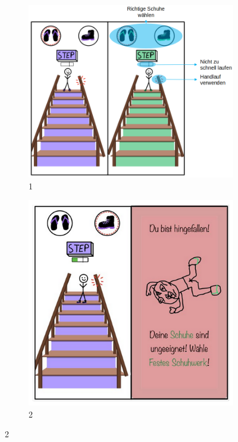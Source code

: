 \documentclass{article}
\begin{document}
\begin{figure}[H]
    \centering
    \begin{subfigure}[t]{0.45\textwidth}
        \centering
        \includegraphics[width=\textwidth]{./resources/StairMaster_1.png}
        \caption{1}
    \end{subfigure}
    \hfill
    \begin{subfigure}[t]{0.45\textwidth}
        \centering
        \includegraphics[width=\textwidth]{./resources/StairMaster_2.png}
        \caption{2}
    \end{subfigure}


\end{figure}
\end{document}
